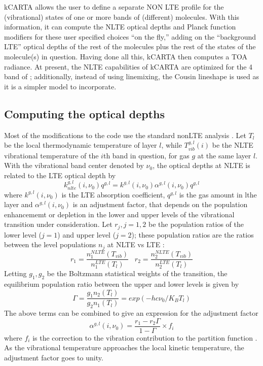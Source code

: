\documentclass[11pt]{article}
\newcommand{\kc}{\textsf{kCARTA}\xspace}
\begin{document}
\kc allows the user to define a separate NON LTE profile for the (vibrational) 
states of one or more bands of (different) molecules. With this information, 
it can compute the NLTE optical depths and Planck function modifiers for 
these user specified choices ``on the fly,'' adding on the ``background LTE'' 
optical depths of the rest of the molecules plus the rest of the states of 
the molecule(s) in question. Having done all this, \kc then computes a 
TOA radiance. At present, the NLTE capabilities of \kc are optimized for the 
4 \um band of \cd; additionally, instead of using linemixing, the Cousin 
lineshape is used as it is a simpler model to incorporate.

\subsection{Computing the optical depths}
Most of the modifications to the code use the standard nonLTE analysis 
\cite{edw:93,edw:98,lop:01,kopra}. Let $T_{l}$ be the local thermodynamic
temperature of layer $l$, while $T_{vib}^{g,l}(i)$ be the NLTE vibrational 
temperature of the $i$th band in question, for gas $g$ at the same layer $l$.
With the vibrational band center denoted by $\nu_{0}$, the optical depths 
at NLTE is related to the LTE optical depth by \\
\[
k_{nlte}^{g,l}(i,\nu_0) q^{g,l} = 
      k^{g,l}(i,\nu_0) \alpha^{g,l}(i,\nu_0) q^{g,l}
\]
where $k^{g,l}(i,\nu_0)$ is the LTE absorption coefficient, $q^{g,l}$ is the
gas amount in lthe layer and $\alpha^{g,l}(i,\nu_0)$ is an
adjustment factor, that depends on the population enhancememt or depletion in
the lower and upper levels of the vibrational transition under consideration.
Let $r_{j}, j = 1,2$ be the population ratios of the lower level ($j=1$) and
upper level ($j=2$); these population ratios are the ratios between the 
level populations $n_{j}$ at NLTE vs LTE : 
\[
r_{1} = \frac{n_{1}^{NLTE}(T_{vib})}{n_{1}^{LTE}(T_{l})} \;\;\;
r_{2} = \frac{n_{2}^{NLTE}(T_{vib})}{n_{2}^{LTE}(T_{l})}
\]
Letting $g_1,g_2$ be the Boltzmann statistical weights of the transition, the
equilibrium population ratio between the upper and lower levels is given by
\cite{edw:93,lop:01}
\[
\Gamma = \frac{g_{1}n_{2}(T_{l})}{g_{2}n_{1}(T_{l})} = 
exp(-hc\nu_{0}/K_{B}T_{l})
\]
The above terms can be combined to \cite{edw:93,lop:01} give an expression for
the adjustment factor
\[
\alpha^{g,l}(i,\nu_0) = \frac{r_1 - r_2 \Gamma}{1 - \Gamma} \times f_{i}
\]
where $f_{i}$ is the correction to the vibration contribution to the partition 
function \cite{edw:93,edw:98}. As the vibrational temperature approaches the
local kinetic temperature, the adjustment factor goes to unity.
\end{document}
